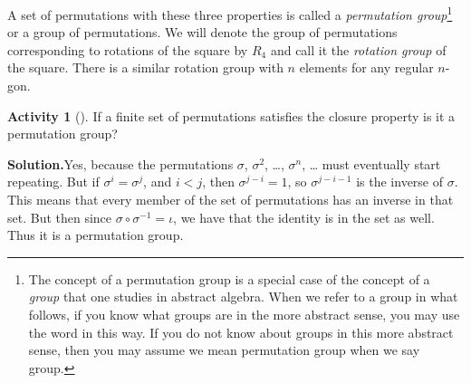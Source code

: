 \documentclass[10pt,]{book}
\theoremstyle{plain}
\theoremstyle{definition}
\newtheorem{activity}[project]{Activity}
\numberwithin{equation}{chapter}
\newcommand{\lt}{<}
\begin{document}
%
\par
A set of permutations with these three properties is called a \emph{permutation group}\footnote{The concept of a permutation group is a special case of the concept of a \emph{group} that one studies in abstract algebra.  When we refer to a group in what follows, if you  know what groups are in the more abstract sense, you may use the word in this way. If you do not know about groups in this more abstract sense, then you may assume we mean permutation group when we say group.\label{fn-18}} or a group of permutations. We will denote the group of permutations corresponding to rotations of the square by \(R_4\) and call it the \emph{rotation group} of the square. There is a similar rotation group with \(n\) elements for any regular \(n\)-gon.%
\begin{activity}[]\label{activity-255}
If a finite set of permutations satisfies the closure property is it a permutation group?%
\par\medskip\noindent%
\textbf{Solution.}\quad Yes, because the permutations \(\sigma\), \(\sigma^2\), \dots{}, \(\sigma^n\), \dots{} must eventually start repeating. But if \(\sigma^i=\sigma^j\), and \(i\lt j\), then \(\sigma^{j-i} =1\), so \(\sigma^{j-i-1}\) is the inverse of \(\sigma\). This means that every member of the set of permutations has an inverse in that set. But then since \(\sigma\circ\sigma^{-1} = \iota\), we have that the identity is in the set as well. Thus it is a permutation group.%
\end{activity}
\end{document}
